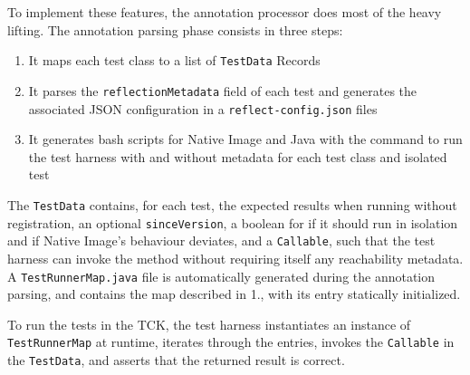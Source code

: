 To implement these features, the annotation processor does most of the heavy lifting. The annotation parsing phase consists in three steps:
\begin{enumerate}
    \item It maps each test class to a list of \verb|TestData| Records 
    \item It parses the \verb|reflectionMetadata| field of each test and generates the associated JSON configuration in a \verb|reflect-config.json| files
    \item It generates bash scripts for Native Image and Java with the command to run the test harness with and without metadata for each test class and isolated test
\end{enumerate}
The \verb|TestData| contains, for each test, the expected results when running without registration, an optional \verb|sinceVersion|, a boolean for if it should run in isolation and if Native Image's behaviour deviates, and a \verb|Callable|, such that the test harness can invoke the method without requiring itself any reachability metadata.  
A \verb|TestRunnerMap.java| file is automatically generated during the annotation parsing, and contains the map described in 1., with its entry statically initialized. 

To run the tests in the TCK, the test harness instantiates an instance of \verb|TestRunnerMap| at runtime, iterates through the entries, invokes the \verb|Callable| in the \verb|TestData|, and asserts that the returned result is correct.


